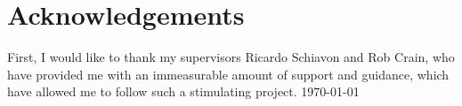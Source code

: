 \chapter*{Acknowledgements}

First, I would like to thank my supervisors Ricardo Schiavon and Rob Crain, who have provided me with an immeasurable amount of support and guidance, which have allowed me to follow such a stimulating project.  
\vfill
{\sc \AuthorName \hfill\today}